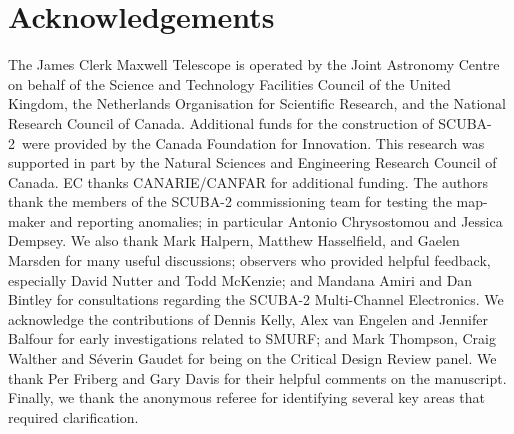 \documentclass[useAMS,usenatbib,nofootinbib]{mn2e}
\newcommand{\scuba}{SCUBA-2}
\begin{document}
\section{Acknowledgements}

The James Clerk Maxwell Telescope is operated by the Joint Astronomy
Centre on behalf of the Science and Technology Facilities Council of
the United Kingdom, the Netherlands Organisation for Scientific
Research, and the National Research Council of Canada. Additional
funds for the construction of \scuba\ were provided by the Canada
Foundation for Innovation.  This research was supported in part by the
Natural Sciences and Engineering Research Council of Canada.  EC
thanks CANARIE/CANFAR for additional funding.  The authors thank the
members of the SCUBA-2 commissioning team for testing the map-maker
and reporting anomalies; in particular Antonio Chrysostomou and
Jessica Dempsey.  We also thank Mark Halpern, Matthew Hasselfield, and
Gaelen Marsden for many useful discussions; observers who provided
helpful feedback, especially David Nutter and Todd McKenzie; and
Mandana Amiri and Dan Bintley for consultations regarding the SCUBA-2
Multi-Channel Electronics.  We acknowledge the contributions of Dennis
Kelly, Alex van Engelen and Jennifer Balfour for early investigations
related to SMURF; and Mark Thompson, Craig Walther and S\'{e}verin
Gaudet for being on the Critical Design Review panel. We thank Per
Friberg and Gary Davis for their helpful comments on the
manuscript. Finally, we thank the anonymous referee for identifying
several key areas that required clarification.




\end{document}

